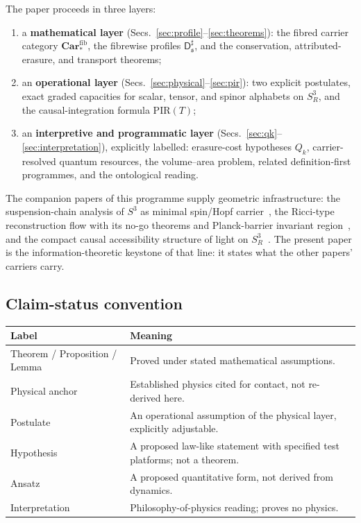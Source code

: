 \documentclass[11pt,a4paper]{article}
\theoremstyle{definition}
\theoremstyle{remark}
\newcommand{\Sthree}{S^{3}}
\newcommand{\Dsharp}{\mathsf{D}^{\sharp}}
\newcommand{\Car}{\mathbf{Car}}
\newcommand{\PIR}{\mathrm{PIR}}
\begin{document}
The paper proceeds in three layers:

\begin{enumerate}[label=(\Roman*)]
\item a \textbf{mathematical layer} (Secs.~\ref{sec:profile}--\ref{sec:theorems}): the
fibred carrier category $\Car_*^{\mathrm{fib}}$, the fibrewise profiles
$\Dsharp_{\mathfrak s}$, and the conservation, attributed-erasure, and transport theorems;
\item an \textbf{operational layer} (Secs.~\ref{sec:physical}--\ref{sec:pir}): two explicit
postulates, exact graded capacities for scalar, tensor, and spinor alphabets on
$\Sthree_{R}$, and the causal-integration formula $\PIR(T)$;
\item an \textbf{interpretive and programmatic layer}
(Secs.~\ref{sec:qk}--\ref{sec:interpretation}), explicitly labelled: erasure-cost hypotheses
$Q_{k}$, carrier-resolved quantum resources, the volume--area problem, related definition-first
programmes, and the ontological reading.
\end{enumerate}

The companion papers of this programme supply geometric infrastructure: the suspension-chain
analysis of $\Sthree$ as minimal spin/Hopf carrier~\cite{PB2026susp}, the Ricci-type
reconstruction flow with its no-go theorems and Planck-barrier invariant
region~\cite{BP2026ricci}, and the compact causal accessibility structure of light on
$\Sthree_{R}$~\cite{PB2026light}.  The present paper is the information-theoretic keystone of
that line: it states what the other papers' carriers carry.

\subsection{Claim-status convention}

\begin{center}
\small
\begin{tabularx}{\textwidth}{@{}lY@{}}
\toprule
\textbf{Label} & \textbf{Meaning} \\
\midrule
Theorem / Proposition / Lemma & Proved under stated mathematical assumptions.\\
Physical anchor & Established physics cited for contact, not re-derived here.\\
Postulate & An operational assumption of the physical layer, explicitly adjustable.\\
Hypothesis & A proposed law-like statement with specified test platforms; not a theorem.\\
Ansatz & A proposed quantitative form, not derived from dynamics.\\
Interpretation & Philosophy-of-physics reading; proves no physics.\\
\bottomrule
\end{tabularx}
\end{center}
\end{document}
